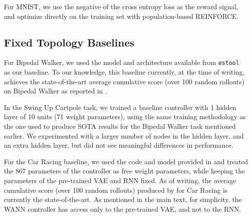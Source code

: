 For MNIST, we use the negative of the cross entropy loss as the reward signal, and optimize directly on the training set with population-based REINFORCE.

\subsection{Fixed Topology Baselines}

For Bipedal Walker, we used the model and architecture available from \texttt{estool}~\cite{ha2017evolving} as our baseline. To our knowledge, this baseline currently, at the time of writing, achieves the state-of-the-art average cumulative score (over 100 random rollouts) on Bipedal Walker as reported in \cite{ha2018designrl}.

In the Swing Up Cartpole task, we trained a baseline controller with 1 hidden layer of 10 units (71 weight parameters), using the same training methodology as the one used to produce SOTA results for the Bipedal Walker task mentioned earlier. We experimented with a larger number of nodes in the hidden layer, and an extra hidden layer, but did not see meaningful differences in performance.

For the Car Racing baseline, we used the code and model provided in \cite{ha2018worldmodels} and treated the 867 parameters of the controller as free weight parameters, while keeping the parameters of the pre-trained VAE and RNN fixed. As of writing, the average cumulative score (over 100 random rollouts) produced by \cite{ha2018worldmodels} for Car Racing is currently the state-of-the-art. As mentioned in the main text, for simplicity, the WANN controller has access only to the pre-trained VAE, and not to the RNN.
